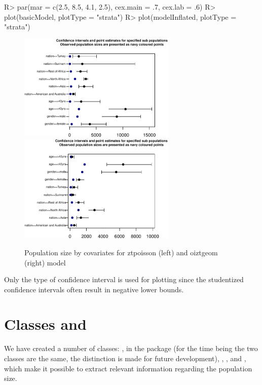 \documentclass[
]{jss}
\newcommand{\1}{\mathcal{I}} \newcommand{\bZero}{\boldsymbol{0}}
\begin{document}
\begin{CodeChunk}
\begin{CodeInput}
R> par(mar = c(2.5, 8.5, 4.1, 2.5), cex.main = .7, cex.lab = .6)
R> plot(basicModel, plotType = "strata")
R> plot(modelInflated, plotType = "strata")
\end{CodeInput}
\begin{figure}[ht]

{\centering \includegraphics[width=7.5cm]{singleRcapture_files/figure-latex/strata_plot-1} \includegraphics[width=7.5cm]{singleRcapture_files/figure-latex/strata_plot-2} 

}

\caption[Population size by covariates for ztpoisson (left) and oiztgeom (right) model]{Population size by covariates for ztpoisson (left) and oiztgeom (right) model}\label{fig:strata_plot}
\end{figure}
\end{CodeChunk}

Only the  type of confidence interval is used for
plotting since the studentized confidence intervals often result in
negative lower bounds.

\section[Classes and S3methods]{Classes and }\label{sec-methods}

We have created a number of classes: ,
 in the package (for the time being the two classes are
the same, the distinction is made for future development),
, ,
 and ,
which make it possible to extract relevant information regarding the
population size.
\end{document}
